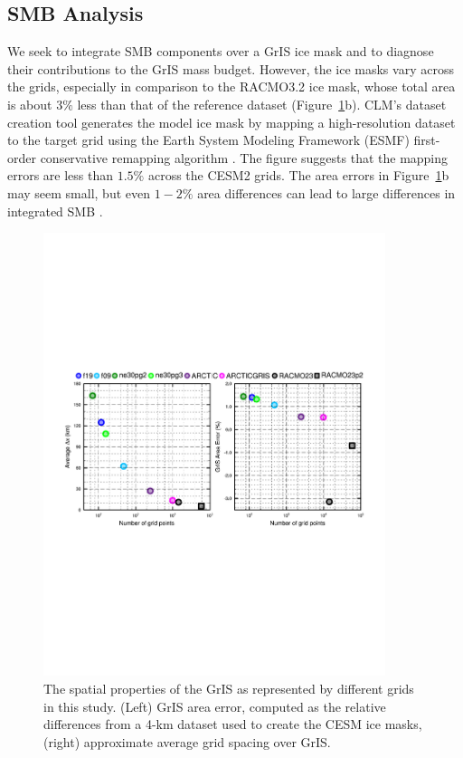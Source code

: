 \documentclass[draft]{agujournal2019}
\begin{document}
\subsection{SMB Analysis}\label{sec:SMB}

We seek to integrate SMB components over a GrIS ice mask and to diagnose their contributions to the GrIS mass budget. However, the ice masks vary across the grids, especially in comparison to the RACMO3.2 ice mask, whose total area is about $3\%$ less than that of the reference dataset (Figure~\ref{fig:grisdx}b). CLM's dataset creation tool generates the model ice mask by mapping a high-resolution dataset to the target grid using the Earth System Modeling Framework (ESMF) first-order conservative remapping algorithm \cite{ESMF}. The figure suggests that the mapping errors are less than $1.5\%$ across the CESM2 grids. The area errors in Figure~\ref{fig:grisdx}b may  seem small, but even $1-2\%$ area differences can lead to large differences in integrated SMB \cite{HETAL2022TC}. 

\begin{figure}[t]
\begin{center}
         \includegraphics[width=100mm]{figs/temp_grisres.pdf}
\end{center}
\caption{The spatial properties of the GrIS as represented by different grids in this study. (Left) GrIS area error, computed as the relative differences from a 4-km dataset used to create the CESM ice masks, (right) approximate average grid spacing over GrIS.}
\label{fig:grisdx}
\end{figure}
\end{document}
